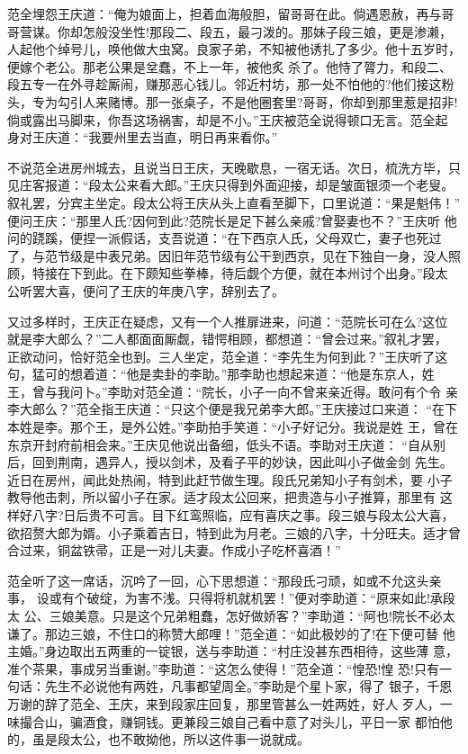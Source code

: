 范全埋怨王庆道：“俺为娘面上，担着血海般胆，留哥哥在此。倘遇恩赦，再与哥
哥营谋。你却怎般没坐性!那段二、段五，最刁泼的。那妹子段三娘，更是渗濑，
人起他个绰号儿，唤他做大虫窝。良家子弟，不知被他诱扎了多少。他十五岁时，
便嫁个老公。那老公果是坌蠢，不上一年，被他炙杀了。他恃了膂力，和段二、
段五专一在外寻趁厮闹，赚那恶心钱儿。邻近村坊，那一处不怕他的?他们接这粉
头，专为勾引人来赌博。那一张桌子，不是他圈套里?哥哥，你却到那里惹是招非!
倘或露出马脚来，你吾这场祸害，却是不小。”王庆被范全说得顿口无言。范全起
身对王庆道：“我要州里去当直，明日再来看你。”

不说范全进房州城去，且说当日王庆，天晚歇息，一宿无话。次日，梳洗方毕，只
见庄客报道：“段太公来看大郎。”王庆只得到外面迎接，却是皱面银须一个老叟。
叙礼罢，分宾主坐定。段太公将王庆从头上直看至脚下，口里说道：“果是魁伟！”
便问王庆：“那里人氏?因何到此?范院长是足下甚么亲戚?曾娶妻也不？”王庆听
他问的跷蹊，便捏一派假话，支吾说道：“在下西京人氏，父母双亡，妻子也死过
了，与范节级是中表兄弟。因旧年范节级有公干到西京，见在下独自一身，没人照
顾，特接在下到此。在下颇知些拳棒，待后觑个方便，就在本州讨个出身。”段太
公听罢大喜，便问了王庆的年庚八字，辞别去了。

又过多样时，王庆正在疑虑，又有一个人推扉进来，问道：“范院长可在么?这位
就是李大郎么？”二人都面面厮觑，错愕相顾，都想道：“曾会过来。”叙礼才罢，
正欲动问，恰好范全也到。三人坐定，范全道：“李先生为何到此？”王庆听了这
句，猛可的想着道：“他是卖卦的李助。”那李助也想起来道：“他是东京人，姓
王，曾与我问卜。”李助对范全道：“院长，小子一向不曾来亲近得。敢问有个令
亲李大郎么？”范全指王庆道：“只这个便是我兄弟李大郎。”王庆接过口来道：
“在下本姓是李。那个王，是外公姓。”李助拍手笑道：“小子好记分。我说是姓
王，曾在东京开封府前相会来。”王庆见他说出备细，低头不语。李助对王庆道：
“自从别后，回到荆南，遇异人，授以剑术，及看子平的妙诀，因此叫小子做金剑
先生。近日在房州，闻此处热闹，特到此赶节做生理。段氏兄弟知小子有剑术，要
小子教导他击刺，所以留小子在家。适才段太公回来，把贵造与小子推算，那里有
这样好八字?日后贵不可言。目下红鸾照临，应有喜庆之事。段三娘与段太公大喜，
欲招赘大郎为婿。小子乘着吉日，特到此为月老。三娘的八字，十分旺夫。适才曾
合过来，铜盆铁帚，正是一对儿夫妻。作成小子吃杯喜酒！”

范全听了这一席话，沉吟了一回，心下思想道：“那段氏刁顽，如或不允这头亲事，
设或有个破绽，为害不浅。只得将机就机罢！”便对李助道：“原来如此!承段太
公、三娘美意。只是这个兄弟粗蠢，怎好做娇客？”李助道：“阿也!院长不必太
谦了。那边三娘，不住口的称赞大郎哩！”范全道：“如此极妙的了!在下便可替
他主婚。”身边取出五两重的一锭银，送与李助道：“村庄没甚东西相待，这些薄
意，准个茶果，事成另当重谢。”李助道：“这怎么使得！”范全道：“惶恐!惶
恐!只有一句话：先生不必说他有两姓，凡事都望周全。”李助是个星卜家，得了
银子，千恩万谢的辞了范全、王庆，来到段家庄回复，那里管甚么一姓两姓，好人
歹人，一味撮合山，骗酒食，赚铜钱。更兼段三娘自己看中意了对头儿，平日一家
都怕他的，虽是段太公，也不敢拗他，所以这件事一说就成。

